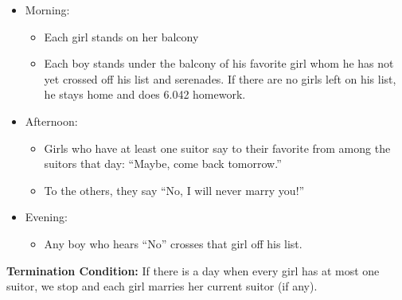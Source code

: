 \documentclass[12pt]{article}
\begin{document}
\begin{itemize}
\item Morning:
\begin{itemize}
\item Each girl stands on her balcony
\item Each boy stands under the balcony of his favorite girl
whom he has not yet crossed off his list and serenades.
If there are no girls left on his list, he stays home and does 6.042 homework.
\end{itemize}
\item Afternoon:
\begin{itemize}
\item Girls who have at least one suitor say to their favorite
from among the suitors that day:  ``Maybe, come back tomorrow.''
\item To the others, they say ``No, I will never marry you!''
\end{itemize}
\item Evening:
\begin{itemize}
\item Any boy who hears ``No'' crosses that girl off his list.
\end{itemize}
\end{itemize}

\noindent
{\bf Termination Condition:}
If there is a day when every girl has at most one suitor, we stop
and each girl marries her current suitor (if any).
\end{document}
